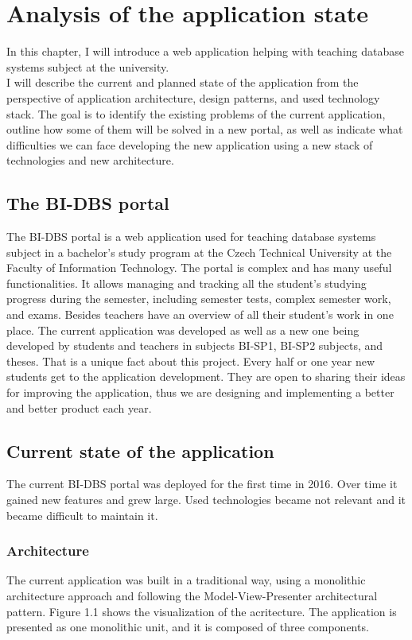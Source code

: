 \chapter{Analysis of the application state}

In this chapter, I will introduce a web application helping with teaching database systems subject at the university. \\
I will describe the current and planned state of the application from the perspective of application architecture, design patterns, and used technology stack. The goal is to identify the existing problems of the current application, outline how some of them will be solved in a new portal, as well as indicate what difficulties we can face developing the new application using a new stack of technologies and new architecture.

\section{The BI-DBS portal}
The BI-DBS portal is a web application used for teaching database systems subject in a bachelor's study program at the Czech Technical University at the Faculty of Information Technology. The portal is complex and has many useful functionalities. It allows managing and tracking all the student's studying progress during the semester, including semester tests, complex semester work, and exams. Besides teachers have an overview of all their student's work in one place.
The current application was developed as well as a new one being developed by students and teachers in subjects BI-SP1, BI-SP2 subjects, and theses. That is a unique fact about this project. Every half or one year new students get to the application development. They are open to sharing their ideas for improving the application, thus we are designing and implementing a better and better product each year.


\section{Current state of the application}
The current BI-DBS portal was deployed for the first time in 2016. Over time it gained new features and grew large. Used technologies became not relevant and it became difficult to maintain it. 

\subsection{Architecture}
The current application was built in a traditional way, using a monolithic architecture approach and following the Model-View-Presenter architectural pattern\cite{potel_mvp}. Figure 1.1 shows the visualization of the acritecture. The application is presented as one monolithic unit, and it is composed  of three components.

